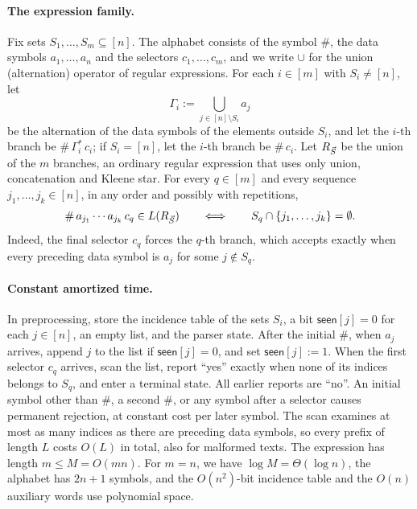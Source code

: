 \paragraph{The expression family.}
Fix sets $S_1,\dots,S_m\subseteq[n]$. The alphabet consists of the symbol $\#$, the data symbols $a_1,\dots,a_n$ and the selectors $c_1,\dots,c_m$, and we write $\cup$ for the union (alternation) operator of regular expressions. For each $i\in[m]$ with $S_i\ne[n]$, let
\[
\Gamma_i := \bigcup_{j\in[n]\setminus S_i} a_j
\]
be the alternation of the data symbols of the elements outside $S_i$, and let the $i$-th branch be $\#\,\Gamma_i^*\,c_i$; if $S_i=[n]$, let the $i$-th branch be $\#\,c_i$. Let $R_{\vec{S}}$ be the union of the $m$ branches, an ordinary regular expression that uses only union, concatenation and Kleene star. For every $q\in[m]$ and every sequence $j_1,\dots,j_k\in[n]$, in any order and possibly with repetitions,
\begin{equation}\label{eq:streaming-regex-reduction}
\#\,a_{j_1}\cdots a_{j_k}\,c_q\in L(R_{\vec{S}})
\qquad\Longleftrightarrow\qquad
S_q\cap\{j_1,\dots,j_k\}=\emptyset.
\end{equation}
Indeed, the final selector $c_q$ forces the $q$-th branch, which accepts exactly when every preceding data symbol is $a_j$ for some $j\notin S_q$.

\paragraph{Constant amortized time.}
In preprocessing, store the incidence table of the sets $S_i$, a bit $\mathsf{seen}[j]=0$ for each $j\in[n]$, an empty list, and the parser state. After the initial $\#$, when $a_j$ arrives, append $j$ to the list if $\mathsf{seen}[j]=0$, and set $\mathsf{seen}[j]:=1$. When the first selector $c_q$ arrives, scan the list, report ``yes'' exactly when none of its indices belongs to $S_q$, and enter a terminal state. All earlier reports are ``no''. An initial symbol other than $\#$, a second $\#$, or any symbol after a selector causes permanent rejection, at constant cost per later symbol. The scan examines at most as many indices as there are preceding data symbols, so every prefix of length $L$ costs $O(L)$ in total, also for malformed texts. The expression has length $m\le M=O(mn)$. For $m=n$, we have $\log M=\Theta(\log n)$, the alphabet has $2n+1$ symbols, and the $O(n^2)$-bit incidence table and the $O(n)$ auxiliary words use polynomial space.

